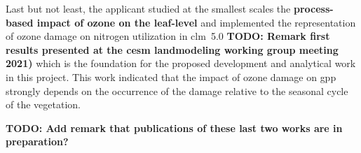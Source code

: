Last but not least, the applicant studied at the smallest scales the \textbf{process-based impact of ozone on the leaf-level} and implemented the representation of ozone damage on nitrogen utilization in \gls{clm}~5.0 \textbf{\color{red}TODO: Remark first results presented at the \gls{cesm} landmodeling working group meeting 2021)} which is the foundation for the proposed development and analytical work in this project. This work indicated that the impact of ozone damage on \gls{gpp} strongly depends on the occurrence of the damage relative to the seasonal cycle of the vegetation.

\textbf{\color{red}TODO: Add remark that publications of these last two works are in preparation?}

